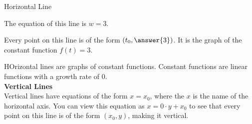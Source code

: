 \documentclass{ximera}
\begin{document}
\begin{example} Horizontal Line





The equation of this line is $w=3$.  

\begin{image}
\end{image}

Every point on this line is of the form $(t_0, \answer{3})$. It is the graph of the constant function $f(t)=3$.


\end{example}
HOrizontal lines are graphs of constant functions.  Constant functions are linear functions with a growth rate of $0$. \\












\textbf{Vertical Lines} \\


Vertical lines have equations of the form $x = x_0$, where the $x$ is the name of the horizontal axis. You can view this equation as $x = 0 \cdot y + x_0$ to see that every point on this line is of the form $(x_0,y)$, making it vertical.
\end{document}
